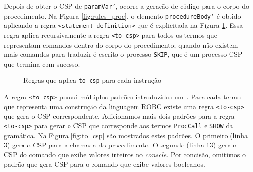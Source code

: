 Depois de obter o CSP de \texttt{paramVar'}, ocorre a geração de código para o corpo do procedimento.
Na Figura \ref{fig:rules_proc}, o elemento \texttt{procedureBody'} é obtido aplicando a regra \texttt{<statement-definition>} que é explicitada na Figura \ref{fig:statement}. Essa regra aplica recursivamente a regra \texttt{<to-csp>} para todos os termos que representam comandos dentro do corpo do procedimento; quando não existem mais comandos para traduzir é escrito o processo \texttt{SKIP}, que é um processo CSP que termina com sucesso.

\begin{figure}[!h]
\centering
\caption{Regras que aplica \texttt{to-csp} para cada instrução}

\label{fig:statement}
\end{figure}

A regra \texttt{<to-csp>} possui múltiplos padrões introduzidos em~\cite{nogueira}. Para cada termo que representa uma construção da linguagem ROBO existe uma regra \texttt{<to-csp>} que gera o CSP correspondente.
Adicionamos mais dois padrões para a regra \texttt{<to-csp>} para gerar o CSP que corresponde aos termos \texttt{ProcCall} e \texttt{SHOW} da gramática. Na Figura \ref{fig:to_csp} são mostrados estes padrões. O primeiro (linha 3) gera o CSP para a chamada do procedimento. O segundo (linha 13) gera o CSP do comando que exibe valores inteiros no \textit{console}.
Por concisão, omitimos o padrão que gera CSP para o comando que exibe valores booleanos. 


